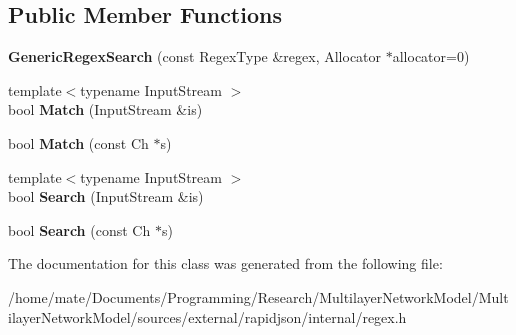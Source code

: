 \subsection*{Public Member Functions}
\begin{DoxyCompactItemize}
\item 
{\bfseries Generic\+Regex\+Search} (const Regex\+Type \&regex, Allocator $\ast$allocator=0)\hypertarget{classinternal_1_1GenericRegexSearch_a72f70e210a4bc944dba62655a008750b}{}\label{classinternal_1_1GenericRegexSearch_a72f70e210a4bc944dba62655a008750b}

\item 
{\footnotesize template$<$typename Input\+Stream $>$ }\\bool {\bfseries Match} (Input\+Stream \&is)\hypertarget{classinternal_1_1GenericRegexSearch_ad204164a20e3ac403b405683b51c2d0b}{}\label{classinternal_1_1GenericRegexSearch_ad204164a20e3ac403b405683b51c2d0b}

\item 
bool {\bfseries Match} (const Ch $\ast$s)\hypertarget{classinternal_1_1GenericRegexSearch_a9d3fe83905549d2fd4c513b8eacd14de}{}\label{classinternal_1_1GenericRegexSearch_a9d3fe83905549d2fd4c513b8eacd14de}

\item 
{\footnotesize template$<$typename Input\+Stream $>$ }\\bool {\bfseries Search} (Input\+Stream \&is)\hypertarget{classinternal_1_1GenericRegexSearch_a766c684321471b468ff468648f186cf0}{}\label{classinternal_1_1GenericRegexSearch_a766c684321471b468ff468648f186cf0}

\item 
bool {\bfseries Search} (const Ch $\ast$s)\hypertarget{classinternal_1_1GenericRegexSearch_a97398161c60f3ed3e4aabaff952c6f1e}{}\label{classinternal_1_1GenericRegexSearch_a97398161c60f3ed3e4aabaff952c6f1e}

\end{DoxyCompactItemize}


The documentation for this class was generated from the following file\+:\begin{DoxyCompactItemize}
\item 
/home/mate/\+Documents/\+Programming/\+Research/\+Multilayer\+Network\+Model/\+Multilayer\+Network\+Model/sources/external/rapidjson/internal/regex.\+h\end{DoxyCompactItemize}
